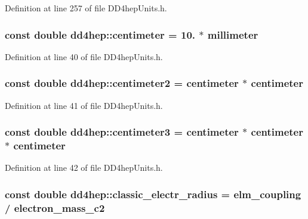 Definition at line 257 of file DD4hepUnits.h.\hypertarget{namespacedd4hep_af17522b334712876a204971dee26c063}{
\subsubsection[{centimeter}]{\setlength{\rightskip}{0pt plus 5cm}const double {\bf dd4hep::centimeter} = 10. $\ast$ {\bf millimeter}}}
\label{namespacedd4hep_af17522b334712876a204971dee26c063}


Definition at line 40 of file DD4hepUnits.h.\hypertarget{namespacedd4hep_a43a537cf81dbb2fb1476264a37bb3945}{
\subsubsection[{centimeter2}]{\setlength{\rightskip}{0pt plus 5cm}const double {\bf dd4hep::centimeter2} = {\bf centimeter} $\ast$ {\bf centimeter}}}
\label{namespacedd4hep_a43a537cf81dbb2fb1476264a37bb3945}


Definition at line 41 of file DD4hepUnits.h.\hypertarget{namespacedd4hep_a5d565a155d7d3b225e52dc0b97c8186d}{
\subsubsection[{centimeter3}]{\setlength{\rightskip}{0pt plus 5cm}const double {\bf dd4hep::centimeter3} = {\bf centimeter} $\ast$ {\bf centimeter} $\ast$ {\bf centimeter}}}
\label{namespacedd4hep_a5d565a155d7d3b225e52dc0b97c8186d}


Definition at line 42 of file DD4hepUnits.h.\hypertarget{namespacedd4hep_ab829ac901c489f46802352c5e2b3c165}{
\subsubsection[{classic\_\-electr\_\-radius}]{\setlength{\rightskip}{0pt plus 5cm}const double {\bf dd4hep::classic\_\-electr\_\-radius} = {\bf elm\_\-coupling} / {\bf electron\_\-mass\_\-c2}}}
\label{namespacedd4hep_ab829ac901c489f46802352c5e2b3c165}


